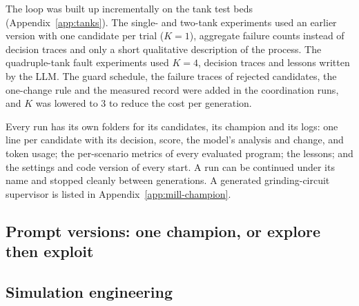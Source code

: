 The loop was built up incrementally on the tank test beds
(Appendix~\ref{app:tanks}). The single- and two-tank experiments
used an earlier version with one candidate per trial ($K=1$), aggregate
failure counts instead of decision traces and only a short qualitative
description of the process. The quadruple-tank fault
experiments used $K=4$, decision traces and lessons written by the LLM. The
guard schedule, the failure traces of rejected candidates, the one-change rule
and the measured record were added in the coordination runs, and $K$ was
lowered to 3 to reduce the cost per generation.

Every run has its own folders for its candidates, its champion and its logs:
one line per candidate with its decision, score, the model's analysis and
change, and token usage; the per-scenario metrics of every evaluated program;
the lessons; and the settings and code version of every start. A run can be
continued under its name and stopped cleanly between generations. A
generated grinding-circuit supervisor is listed in
Appendix~\ref{app:mill-champion}.

\subsection{Prompt versions: one champion, or explore then exploit}
\label{sec:prompt-versions}

\subsection{Simulation engineering}
\label{sec:sim-engineering}

